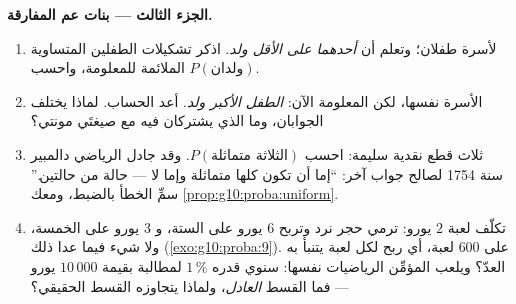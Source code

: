 \begin{problem}
\medskip
\noindent\textbf{الجزء الثالث --- بنات عم المفارقة.}
\begin{enumerate}[resume]
  \item لأسرة طفلان؛ وتعلم أن \emph{أحدهما على الأقل
        ولد}. اذكر تشكيلات الطفلين المتساوية 
        الملائمة للمعلومة، واحسب
        $P(\text{ولدان})$.
  \item الأسرة نفسها، لكن المعلومة الآن: \emph{الطفل
        الأكبر ولد}. أعد الحساب. لماذا يختلف الجوابان،
        وما الذي يشتركان فيه مع صيغتَي مونتي؟
  \item ثلاث قطع نقدية سليمة: احسب $P(\text{الثلاثة متماثلة})$.
        وقد جادل الرياضي دالمبير سنة 1754 لصالح جواب آخر:
        ``إما أن تكون كلها متماثلة وإما لا ---
        حالة من حالتين.'' سمِّ الخطأ بالضبط، ومعك
        \cref{prop:g10:proba:uniform}.
  \item تكلّف لعبة $2$ يورو: ترمي حجر نرد وتربح $6$ يورو على
        الستة، و $3$ يورو على الخمسة، ولا شيء فيما عدا ذلك
        (\cref{exo:g10:proba:9}). على  $600$ لعبة، أي
        ربح  لكل لعبة يتنبأ به العدّ؟ ويلعب
        المؤمِّن الرياضيات نفسها:  سنوي قدره $1\,\%$ لمطالبة
        بقيمة $10\,000$ يورو --- فما القسط
        \emph{العادل}، ولماذا يتجاوزه القسط الحقيقي؟
\end{enumerate}


\end{problem}
